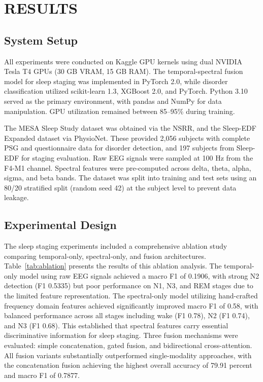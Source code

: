 \documentclass{ieeetj}
\begin{document}
\section{RESULTS}\label{sec:results}

\subsection{System Setup}

All experiments were conducted on Kaggle GPU kernels using dual NVIDIA Tesla T4 GPUs (30 GB VRAM, 15 GB RAM). The temporal-spectral fusion model for sleep staging was implemented in PyTorch 2.0, while disorder classification utilized scikit-learn 1.3, XGBoost 2.0, and PyTorch. Python 3.10 served as the primary environment, with pandas and NumPy for data manipulation. GPU utilization remained between 85--95\% during training.

The MESA Sleep Study dataset was obtained via the NSRR, and the Sleep-EDF Expanded dataset via PhysioNet. These provided 2,056 subjects with complete PSG and questionnaire data for disorder detection, and 197 subjects from Sleep-EDF for staging evaluation. Raw EEG signals were sampled at 100 Hz from the F4-M1 channel. Spectral features were pre-computed across delta, theta, alpha, sigma, and beta bands. The dataset was split into training and test sets using an 80/20 stratified split (random seed 42) at the subject level to prevent data leakage.

\subsection{Experimental Design}

The sleep staging experiments included a comprehensive ablation study comparing temporal-only, spectral-only, and fusion architectures. Table~\ref{tab:ablation} presents the results of this ablation analysis. The temporal-only model using raw EEG signals achieved a macro F1 of 0.1906, with strong N2 detection (F1 0.5335) but poor performance on N1, N3, and REM stages due to the limited feature representation. The spectral-only model utilizing hand-crafted frequency domain features achieved significantly improved macro F1 of 0.58, with balanced performance across all stages including wake (F1 0.78), N2 (F1 0.74), and N3 (F1 0.68). This established that spectral features carry essential discriminative information for sleep staging. Three fusion mechanisms were evaluated: simple concatenation, gated fusion, and bidirectional cross-attention. All fusion variants substantially outperformed single-modality approaches, with the concatenation fusion achieving the highest overall accuracy of 79.91 percent and macro F1 of 0.7877.
\end{document}
